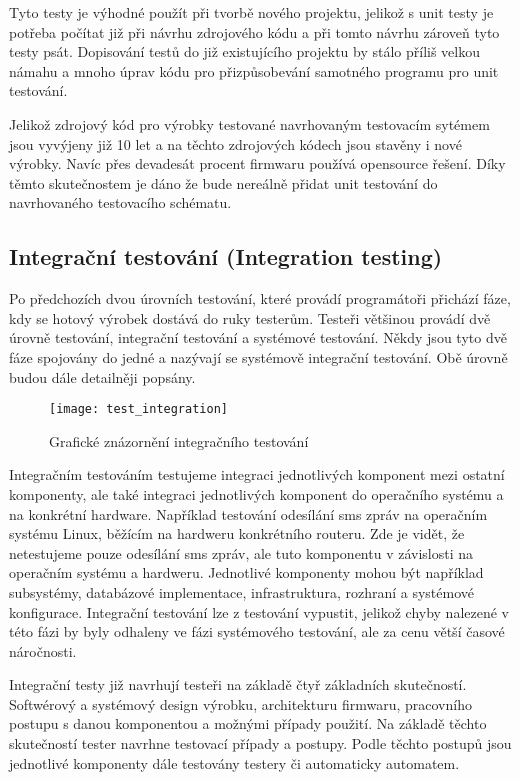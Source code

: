 Tyto testy je výhodné použít při tvorbě nového projektu, jelikož s unit testy je potřeba počítat již při návrhu zdrojového kódu a při tomto návrhu zároveň tyto testy psát. Dopisování testů do již existujícího projektu by stálo příliš velkou námahu a mnoho úprav kódu pro přizpůsobevání samotného programu pro unit testování.

Jelikož zdrojový kód pro výrobky testované navrhovaným testovacím sytémem jsou vyvýjeny již 10 let a na těchto zdrojových kódech jsou stavěny i nové výrobky. Navíc přes devadesát procent firmwaru používá opensource řešení. Díky těmto skutečnostem je dáno že bude nereálně přidat unit testování do navrhovaného testovacího schématu.

\subsection{Integrační testování (Integration testing)}
Po předchozích dvou úrovních testování, které provádí programátoři přichází fáze, kdy se hotový výrobek dostává do ruky testerům. Testeři většinou provádí dvě úrovně testování, integrační testování a systémové testování. Někdy jsou tyto dvě fáze spojovány do jedné a nazývají se systémově integrační testování. Obě úrovně budou dále detailněji popsány.

\begin{figure}[h]
  \centering
  \texttt{[image: test\_integration]}
  \caption{Grafické znázornění integračního testování}
  \label{fig:test_integration}
\end{figure}

Integračním testováním testujeme integraci jednotlivých komponent mezi ostatní komponenty, ale také integraci jednotlivých komponent do operačního systému a na konkrétní hardware. Například testování odesílání sms zpráv na operačním systému Linux, běžícím na hardweru konkrétního routeru. Zde je vidět, že netestujeme pouze odesílání sms zpráv, ale tuto komponentu v závislosti na operačním systému a hardweru. Jednotlivé komponenty mohou být například subsystémy, databázové implementace, infrastruktura, rozhraní a systémové konfigurace. Integrační testování lze z testování vypustit, jelikož chyby nalezené v této fázi by byly odhaleny ve fázi systémového testování, ale za cenu větší časové náročnosti.

Integrační testy již navrhují testeři na základě čtyř základních skutečností. Softwérový a systémový design výrobku, architekturu firmwaru, pracovního postupu s danou komponentou a možnými případy použití. Na základě těchto skutečností tester navrhne testovací případy a postupy. Podle těchto postupů jsou jednotlivé komponenty dále testovány  testery či automaticky automatem.

